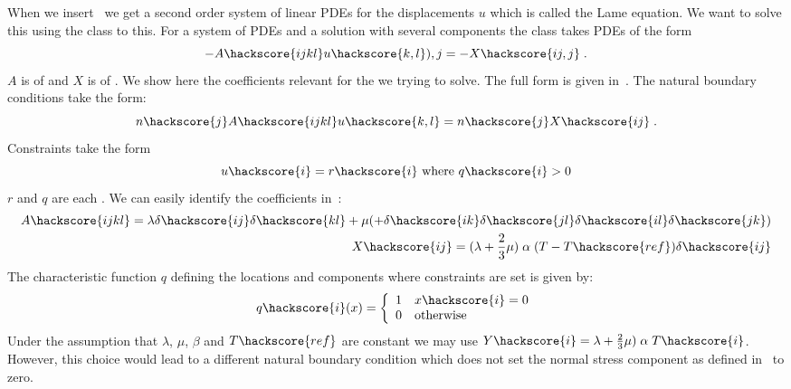 When we insert~ we get a second order system of linear PDEs for the displacements $u$ which is called
the Lame equation. We want to solve
this using the \LinearPDE class to this. For a system of PDEs and a solution with several components the \LinearPDE class 
takes PDEs of the form
\begin{equation}\label{LINEARPDE.SYSTEM.1 TUTORIAL}
-A\hackscore{ijkl} u\hackscore{k,l}){,j}=-X\hackscore{ij,j} \; .
\end{equation}
$A$ is of \RankFour and $X$ is of \RankTwo. We show here the coefficients relevant 
for the we trying to solve. The full form is given in~. 
The natural boundary conditions  take the form:
\begin{equation}\label{LINEARPDE.SYSTEM.2 TUTORIAL}
n\hackscore{j} A\hackscore{ijkl} u\hackscore{k,l}=n\hackscore{j}X\hackscore{ij} \;.
\end{equation}
Constraints  take the form
\begin{equation}\label{LINEARPDE.SYSTEM.3 TUTORIAL}
u\hackscore{i}=r\hackscore{i} \mbox{ where } q\hackscore{i}>0
\end{equation}
$r$ and $q$ are each \RankOne. 
We can easily identify the coefficients in~:
\begin{eqnarray}\label{LINEARPDE ELASTIC COEFFICIENTS}
A\hackscore{ijkl}=\lambda \delta\hackscore{ij} \delta\hackscore{kl} + \mu ( 
+\delta\hackscore{ik} \delta\hackscore{jl}
\delta\hackscore{il} \delta\hackscore{jk}) \\
X\hackscore{ij}=(\lambda+\frac{2}{3} \mu) \;  \alpha \; (T-T\hackscore{ref})\delta\hackscore{ij} \\
\end{eqnarray}
The characteristic function $q$ defining the locations and components where constraints are set is given by:
\begin{equation}\label{HEATEDBLOCK MASK}
q\hackscore{i}(x)=\left\{ 
\begin{array}{cl}
1  & x\hackscore{i}=0  \\ 
0  & \mbox{otherwise}   \\
\end{array}
\right. 
\end{equation}
Under the assumption that $\lambda$, $\mu$, $\beta$ and $T\hackscore{ref}$ 
are constant we may use $Y\hackscore{i}=\lambda+\frac{2}{3} \mu) \; \alpha \; T\hackscore{i}$. However,
this choice would lead to a different natural boundary condition which does not set the normal stress component as defined
in~ to zero.

